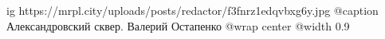 
 
 
 
 

\ifcmt
  ig https://mrpl.city/uploads/posts/redactor/f3fnrz1edqvbxg6y.jpg
	@caption Александровский сквер. Валерий Остапенко
  @wrap center
  @width 0.9
\fi
